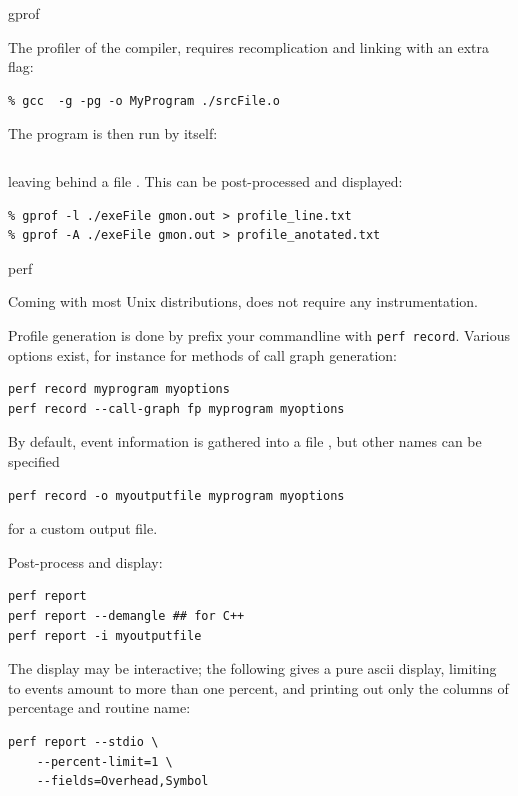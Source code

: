  {gprof}

The profiler of the  compiler, 
requires recomplication and linking with an extra flag:

\begin{lstlisting}[language=shell]
% gcc  -g -pg -c ./srcFile.c 
% gcc  -g -pg -o MyProgram ./srcFile.o 
\end{lstlisting}

The program is then run by itself:
\begin{lstlisting}[language=shell]
% ./MyProgram
\end{lstlisting}
leaving behind a file .
This can be post-processed and displayed:
\begin{lstlisting}[language=shell]
% gprof    ./exeFile gmon.out > profile.txt
% gprof -l ./exeFile gmon.out > profile_line.txt
% gprof -A ./exeFile gmon.out > profile_anotated.txt
\end{lstlisting}

 {perf}

Coming with most Unix distributions,
does not require any instrumentation.

Profile generation is done by prefix your commandline with \lstinline{perf record}.
Various options exist, for instance for methods of call graph generation:
\begin{lstlisting}[language=shell]
perf record myprogram myoptions
perf record --call-graph fp myprogram myoptions
\end{lstlisting}
By default, event information is gathered into a file ,
but other names can be specified
\begin{lstlisting}[language=shell]
perf record -o myoutputfile myprogram myoptions
\end{lstlisting}
for a custom output file.

Post-process and display:
\begin{lstlisting}[language=shell]
perf report
perf report --demangle ## for C++
perf report -i myoutputfile
\end{lstlisting}
The display may be interactive;
the following gives a pure ascii display,
limiting to events amount to more than one percent,
and printing out only the columns of percentage and routine name:
\begin{lstlisting}[language=shell]
perf report --stdio \
    --percent-limit=1 \
    --fields=Overhead,Symbol
\end{lstlisting}

